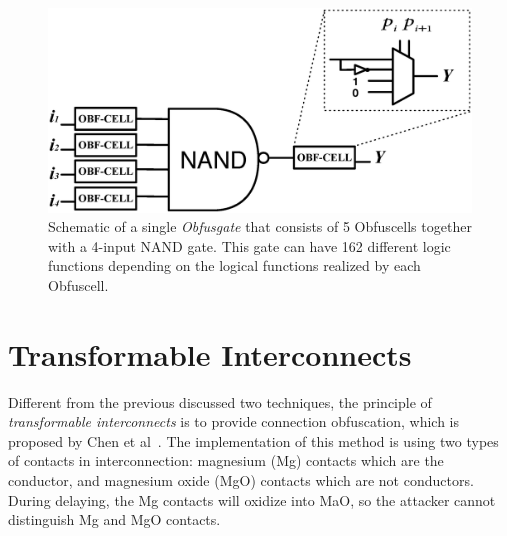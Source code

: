 \documentclass[thesis]{umassthesis}  %
\begin{document}
\begin{figure}[t] 
\begin{center}
\includegraphics[scale=0.5]{figures/obfus_cell.eps}
\caption{Schematic of a single \textit{Obfusgate} that consists of 5 Obfuscells together with a 4-input NAND gate. This gate can have 162 different logic functions depending on the logical functions realized by each Obfuscell.}
\label{fig:obfuscell}
\end{center}
\end{figure}



















\section{Transformable Interconnects}


Different from the previous discussed two techniques, the principle of \textit{transformable interconnects} is to provide connection obfuscation, which is proposed by Chen et al~\cite{chen-2015-dummyWire}. The implementation of this method is using two types of contacts in interconnection: magnesium (Mg) contacts which are the conductor, and magnesium oxide (MgO) contacts which are not conductors. During delaying, the Mg contacts will oxidize into MaO, so the attacker cannot distinguish Mg and MgO contacts.


\end{document}
